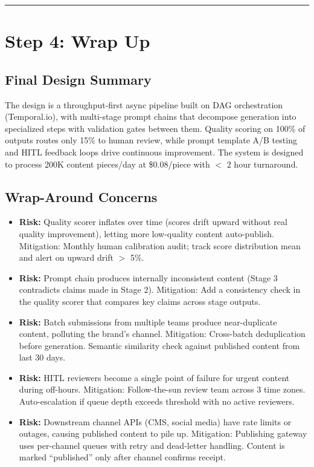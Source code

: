\bigskip\hrule\bigskip

\section*{Step 4: Wrap Up}

\subsection*{Final Design Summary}

The design is a throughput-first async pipeline built on DAG orchestration (Temporal.io), with multi-stage prompt chains that decompose generation into specialized steps with validation gates between them. Quality scoring on 100\% of outputs routes only 15\% to human review, while prompt template A/B testing and HITL feedback loops drive continuous improvement. The system is designed to process 200K content pieces/day at \$0.08/piece with $<$ 2 hour turnaround.

\subsection*{Wrap-Around Concerns}

\begin{itemize}
  \item \textbf{Risk:} Quality scorer inflates over time (scores drift upward without real quality improvement), letting more low-quality content auto-publish. Mitigation: Monthly human calibration audit; track score distribution mean and alert on upward drift $>$ 5\%.
  \item \textbf{Risk:} Prompt chain produces internally inconsistent content (Stage 3 contradicts claims made in Stage 2). Mitigation: Add a consistency check in the quality scorer that compares key claims across stage outputs.
  \item \textbf{Risk:} Batch submissions from multiple teams produce near-duplicate content, polluting the brand's channel. Mitigation: Cross-batch deduplication before generation. Semantic similarity check against published content from last 30 days.
  \item \textbf{Risk:} HITL reviewers become a single point of failure for urgent content during off-hours. Mitigation: Follow-the-sun review team across 3 time zones. Auto-escalation if queue depth exceeds threshold with no active reviewers.
  \item \textbf{Risk:} Downstream channel APIs (CMS, social media) have rate limits or outages, causing published content to pile up. Mitigation: Publishing gateway uses per-channel queues with retry and dead-letter handling. Content is marked ``published'' only after channel confirms receipt.
\end{itemize}

